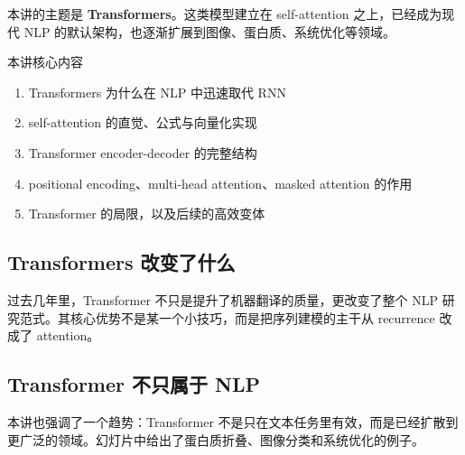 \documentclass[a4paper]{article}
\begin{document}
本讲的主题是 \textbf{Transformers}。这类模型建立在 self-attention 之上，已经成为现代 NLP 的默认架构，也逐渐扩展到图像、蛋白质、系统优化等领域。

\begin{importantbox}{本讲核心内容}
\begin{enumerate}
    \item Transformers 为什么在 NLP 中迅速取代 RNN
    \item self-attention 的直觉、公式与向量化实现
    \item Transformer encoder-decoder 的完整结构
    \item positional encoding、multi-head attention、masked attention 的作用
    \item Transformer 的局限，以及后续的高效变体
\end{enumerate}
\end{importantbox}





\subsection{Transformers 改变了什么}

过去几年里，Transformer 不只是提升了机器翻译的质量，更改变了整个 NLP 研究范式。其核心优势不是某一个小技巧，而是把序列建模的主干从 recurrence 改成了 attention。

















\subsection{Transformer 不只属于 NLP}

本讲也强调了一个趋势：Transformer 不是只在文本任务里有效，而是已经扩散到更广泛的领域。幻灯片中给出了蛋白质折叠、图像分类和系统优化的例子。






\end{document}
